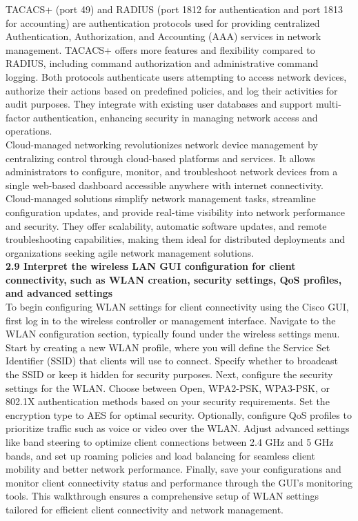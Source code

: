 \documentclass{article}
\begin{document}
	TACACS+ (port 49) and RADIUS (port 1812 for authentication and port 1813 for accounting) are authentication protocols used for providing centralized Authentication, Authorization, and Accounting (AAA) services in network management. TACACS+ offers more features and flexibility compared to RADIUS, including command authorization and administrative command logging. Both protocols authenticate users attempting to access network devices, authorize their actions based on predefined policies, and log their activities for audit purposes. They integrate with existing user databases and support multi-factor authentication, enhancing security in managing network access and operations.\\
	
	Cloud-managed networking revolutionizes network device management by centralizing control through cloud-based platforms and services. It allows administrators to configure, monitor, and troubleshoot network devices from a single web-based dashboard accessible anywhere with internet connectivity. Cloud-managed solutions simplify network management tasks, streamline configuration updates, and provide real-time visibility into network performance and security. They offer scalability, automatic software updates, and remote troubleshooting capabilities, making them ideal for distributed deployments and organizations seeking agile network management solutions.\\
  
\noindent\textbf{2.9 Interpret the wireless LAN GUI configuration for client connectivity, such as WLAN creation, security settings, QoS profiles, and advanced settings}\\

	To begin configuring WLAN settings for client connectivity using the Cisco GUI, first log in to the wireless controller or management interface. Navigate to the WLAN configuration section, typically found under the wireless settings menu. Start by creating a new WLAN profile, where you will define the Service Set Identifier (SSID) that clients will use to connect. Specify whether to broadcast the SSID or keep it hidden for security purposes. Next, configure the security settings for the WLAN. Choose between Open, WPA2-PSK, WPA3-PSK, or 802.1X authentication methods based on your security requirements. Set the encryption type to AES for optimal security. Optionally, configure QoS profiles to prioritize traffic such as voice or video over the WLAN. Adjust advanced settings like band steering to optimize client connections between 2.4 GHz and 5 GHz bands, and set up roaming policies and load balancing for seamless client mobility and better network performance. Finally, save your configurations and monitor client connectivity status and performance through the GUI’s monitoring tools. This walkthrough ensures a comprehensive setup of WLAN settings tailored for efficient client connectivity and network management.
\end{document}
